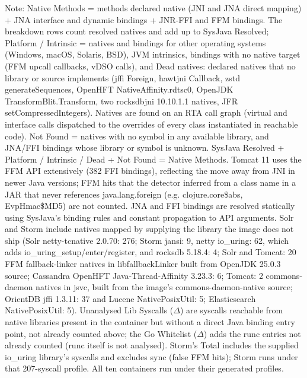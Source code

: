 \begin{table}[t]
\begin{minipage}{\textwidth}
Note: Native Methods = methods declared native (JNI and JNA direct mapping) + JNA interface and dynamic bindings + JNR-FFI and FFM bindings. The breakdown rows count resolved natives and add up to SysJava Resolved; Platform / Intrinsic = natives and bindings for other operating systems (Windows, macOS, Solaris, BSD), JVM intrinsics, bindings with no native target (FFM upcall callbacks, vDSO calls), and Dead natives: declared natives that no library or source implements (jffi Foreign, hawtjni Callback, zstd generateSequences, OpenHFT NativeAffinity.rdtsc0, OpenJDK TransformBlit.Transform, two rocksdbjni 10.10.1.1 natives, JFR setCompressedIntegers). Natives are found on an RTA call graph (virtual and interface calls dispatched to the overrides of every class instantiated in reachable code). Not Found = natives with no symbol in any available library, and JNA/FFI bindings whose library or symbol is unknown. SysJava Resolved + Platform / Intrinsic / Dead + Not Found = Native Methods. Tomcat 11 uses the FFM API extensively (382 FFI bindings), reflecting the move away from JNI in newer Java versions; FFM hits that the detector inferred from a class name in a JAR that never references java.lang.foreign (e.g. clojure.core\$abs, EvpHmac\$MD5) are not counted. JNA and FFI bindings are resolved statically using SysJava's binding rules and constant propagation to API arguments. Solr and Storm include natives mapped by supplying the library the image does not ship (Solr netty-tcnative 2.0.70: 276; Storm jansi: 9, netty io_uring: 62, which adds io\_uring\_setup/enter/register, and rocksdb 5.18.4: 4; Solr and Tomcat: 20 FFM fallback-linker natives in libfallbackLinker built from OpenJDK 25.0.3 source; Cassandra OpenHFT Java-Thread-Affinity 3.23.3: 6; Tomcat: 2 commons-daemon natives in jsvc, built from the image's commons-daemon-native source; OrientDB jffi 1.3.11: 37 and Lucene NativePosixUtil: 5; Elasticsearch NativePosixUtil: 5). Unanalysed Lib Syscalls ($\Delta$) are syscalls reachable from native libraries present in the container but without a direct Java binding entry point, not already counted above; the Go Whitelist ($\Delta$) adds the runc entries not already counted (runc itself is not analysed). Storm's Total includes the supplied io\_uring library's syscalls and excludes sync (false FFM hits); Storm runs under that 207-syscall profile. All ten containers run under their generated profiles.
\end{minipage}
\end{table}
